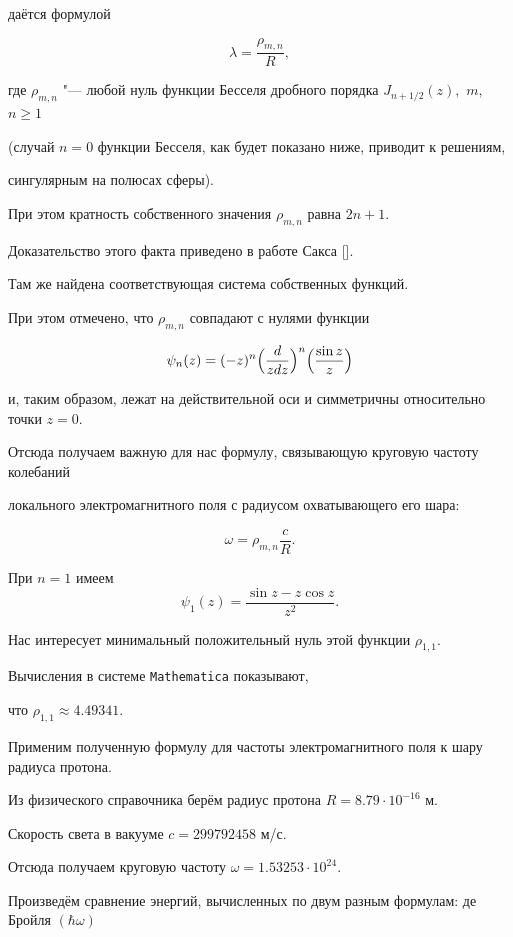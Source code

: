 даётся формулой 

$$\displaystyle\lambda = \frac{\rho_{m,n}}{R},$$ 

где $\rho_{m,n}$ "--- любой нуль функции Бесселя дробного порядка $J_{n+{1}/{2}}(z),$  $m,$ $n \ge 1$

(случай $n = 0$ функции Бесселя, как будет показано ниже, приводит к решениям,

сингулярным на полюсах сферы).

При этом кратность собственного значения $\rho_{m,n}$ равна $2n + 1$. 

Доказательство этого факта приведено в работе Сакса []. 

Там же найдена соответствующая система собственных функций. 

При этом отмечено, что $\rho_{m,n}$ совпадают с нулями функции

$$

\psi_n(z) = (-z)^n\Bigl(\frac{d}{zdz}\Bigr)^n\Bigl(\frac{\sin z}{z}\Bigr)

$$ 

и, таким образом, лежат на действительной оси и симметричны относительно точки $z = 0$. 

Отсюда получаем важную для нас формулу, связывающую круговую частоту колебаний 

локального электромагнитного поля с радиусом охватывающего его шара: 

$$

\displaystyle\omega = \rho_{m,n}\frac{c}{R}.

$$ 

При $n = 1$ имеем $$\displaystyle\psi_1(z) = \frac{\sin z - z\cos z}{z^2}.$$ 

Нас интересует минимальный положительный нуль этой функции $\rho_{1,1}$. 

Вычисления в системе {\tt Mathematica} показывают, 

что $\rho_{1,1} \approx 4.49341$. 



Применим полученную формулу для частоты электромагнитного поля к шару радиуса протона.

Из физического справочника берём радиус протона $R = 8.79\cdot 10^{-16}$ м. 

Скорость света в вакууме $c = 299792458 $ м/с. 

Отсюда получаем круговую частоту $\omega = 1.53253\cdot 10^{24}$. 



Произведём сравнение энергий, вычисленных по двум разным формулам: де Бройля $(\hbar\omega)$

